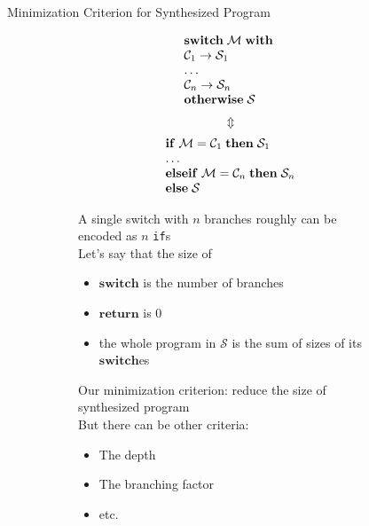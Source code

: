 \documentclass[aspectratio=169
  , xcolor={svgnames}
  , hyperref={ colorlinks,citecolor=Blue
             , linkcolor=DarkRed,urlcolor=DarkBlue}
  , russian
  ]{beamer}
\newcommand{\primi}[1]{\ensuremath{\mathbf{#1}}}
\newcommand{\ir}{\ensuremath{\mathcal{S}}}
\begin{document}
\begin{frame}{Minimization Criterion for Synthesized Program}
\begin{figure}
\begin{subfigure}[b]{0.3\linewidth}
\[
\begin{array}{l}
\primi{switch}\;\mathcal{M}\;\primi{with}\; \\
\mathcal{C}_1\; \primi{\rightarrow}\; \ir_1\\
\dots \\
\mathcal{C}_n\; \primi{\rightarrow}\; \ir_n\\
\primi{otherwise}\;\ir\\
\end{array}\\
\]
\[
\Updownarrow
\]
\[
\begin{array}{l}
\primi{if}\; \mathcal{M} = \mathcal{C}_1\;\primi{then}\; \ir_1\\
\dots \\
\primi{else if}\; \mathcal{M} = \mathcal{C}_n\; \primi{then}\;  \ir_n\\
\primi{else}\;\ir\\
\end{array}\\
\]
\vspace{1cm}

\end{subfigure}
\hspace{1cm}
\begin{subfigure}[b]{0.6\linewidth}
A single switch with $n$ branches roughly can be encoded as $n$ \texttt{if}s\\

Let's say that the size of
\begin{itemize}
\item  $\primi{switch}$ is the number of branches
\item $\primi{return}$ is 0
\item the whole program in $\ir$ is the sum of sizes of its $\primi{switch}$es 
\end{itemize}
Our minimization criterion: reduce the size of synthesized program\\

But there can be other criteria:
\begin{itemize}
\item The  depth 
\item The branching factor
\item etc.
\end{itemize}
\end{subfigure}
\end{figure}
\end{frame}
\end{document}

